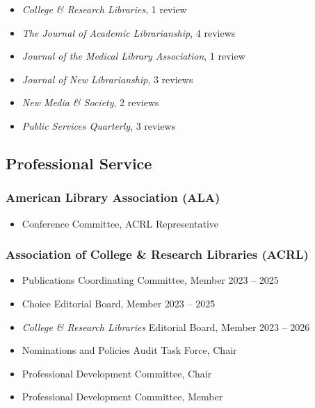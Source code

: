 \documentclass[
  letterpaper,
  DIV=11,
  numbers=noendperiod]{scrartcl}
\providecommand{\tightlist}{%
  \setlength{\itemsep}{0pt}\setlength{\parskip}{0pt}}\usepackage{longtable,booktabs,array}
\begin{document}
\begin{itemize}
\tightlist
\item
  \emph{College \& Research Libraries}, 1 review
\item
  \emph{The Journal of Academic Librarianship}, 4 reviews
\item
  \emph{Journal of the Medical Library Association}, 1 review
\item
  \emph{Journal of New Librarianship}, 3 reviews
\item
  \emph{New Media \& Society}, 2 reviews
\item
  \emph{Public Services Quarterly}, 3 reviews
\end{itemize}

\subsection{\texorpdfstring{ Professional
Service}{ Professional Service}}\label{professional-service}

\subsubsection{American Library Association
(ALA)}\label{american-library-association-ala}

\begin{itemize}
\tightlist
\item
  Conference Committee, ACRL Representative
\end{itemize}

\subsubsection{Association of College \& Research Libraries
(ACRL)}\label{association-of-college-research-libraries-acrl}

\begin{itemize}
\tightlist
\item
  Publications Coordinating Committee, Member {2023 -- 2025}
\item
  Choice Editorial Board, Member {2023 -- 2025}
\item
  \emph{College \& Research Libraries} Editorial Board, Member {2023 --
  2026}
\item
  Nominations and Policies Audit Task Force, Chair
\item
  Professional Development Committee, Chair
\item
  Professional Development Committee, Member
\end{itemize}
\end{document}
